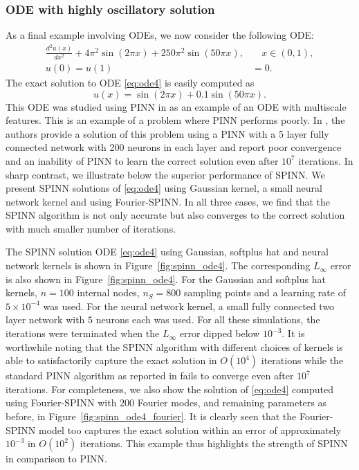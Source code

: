 \documentclass[12pt]{article}
\newcommand{\rr}[1]{#1}
\begin{document}
\subsubsection{ODE with highly oscillatory solution}
\rr{As a final example involving ODEs, we now consider the following ODE:
\begin{equation} \label{eq:ode4}
\begin{split}
\frac{d^2u(x)}{dx^2} + 4\pi^2\sin(2\pi x) + 250\pi^2\sin(50\pi x), &\quad x \in (0,1),\\
u(0) = u(1) &= 0.
\end{split}
\end{equation}
The exact solution to ODE \eqref{eq:ode4} is easily computed as
\begin{equation} \label{eq:ode4_exact}
u(x) = \sin(2\pi x) + 0.1\sin(50\pi x).
\end{equation}
This ODE was studied using PINN in \cite{WANG2021113938} as an example of an ODE with multiscale features. This is an example of a problem where PINN performs poorly. In \cite{WANG2021113938}, the authors provide a solution of this problem using a PINN with a 5 layer fully connected network with 200 neurons in each layer and report poor convergence and an inability of PINN to learn the correct solution even after $10^7$ iterations. In sharp contrast, we illustrate below the superior performance of SPINN. We present SPINN solutions of \eqref{eq:ode4} using Gaussian kernel, a small neural network kernel and using Fourier-SPINN. In all three cases, we find that the SPINN algorithm is not only accurate but also converges to the correct solution with much smaller number of iterations.

The SPINN solution ODE \eqref{eq:ode4} using Gaussian, softplus hat and neural network kernels is shown in Figure~\ref{fig:spinn_ode4}. The corresponding $L_\infty$ error is also shown in Figure~\ref{fig:spinn_ode4}. For the Gaussian and softplus hat kernels, $n = 100$ internal nodes, $n_S = 800$ sampling points and a learning rate of $5\times 10^{-4}$ was used. For the neural network kernel, a small fully connected two layer network with $5$ neurons each was used. For all these simulations, the iterations were terminated when the $L_\infty$ error dipped below $10^{-3}$. It is worthwhile noting that the SPINN algorithm with different choices of kernels is able to satisfactorily capture the exact solution in $O(10^4)$ iterations while the standard PINN algorithm as reported in \cite{WANG2021113938} fails to converge even after $10^7$ iterations. For completeness, we also show the solution of \eqref{eq:ode4} computed using Fourier-SPINN with $200$ Fourier modes, and remaining parameters as before, in Figure~\ref{fig:spinn_ode4_fourier}. It is clearly seen that the Fourier-SPINN model too captures the exact solution within an error of approximately $10^{-3}$ in $O(10^2)$ iterations. This example thus highlights the strength of SPINN in comparison to PINN.

}
\end{document}
